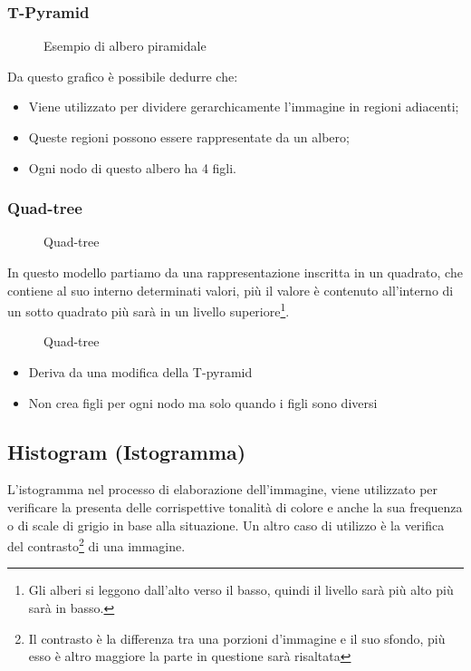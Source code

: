 \documentclass{report}
\begin{document}
\subsubsection{T-Pyramid}
\label{sec:treepy}
\begin{figure}[ht!]
  \centering
  \resizebox{15cm}{!}{
  }
  \caption{Esempio di albero piramidale}
  \label{fig:alberopir}
\end{figure}
Da questo grafico è possibile dedurre che:
\begin{itemize}
\item Viene utilizzato per dividere gerarchicamente l'immagine in regioni
  adiacenti;
\item Queste regioni possono essere rappresentate da un albero;
\item Ogni nodo di questo albero ha 4 figli.
\end{itemize}
\clearpage
\subsubsection{Quad-tree}
\label{sec:quad-tree}
\begin{figure}[ht!]
  \centering
  
  \caption{Quad-tree}
  \label{fig:qtree1}
\end{figure}
In questo modello partiamo da una rappresentazione inscritta in un
quadrato, che contiene al suo interno determinati valori, più il valore
è contenuto all'interno di un sotto quadrato più sarà in un livello
superiore\footnote{Gli alberi si leggono dall'alto verso il basso, quindi
  il livello sarà più alto più sarà in basso.}.
\begin{figure}[ht!]
  \centering
  
  \caption{Quad-tree}
  \label{fig:qtree2}
\end{figure}
\begin{itemize}
\item Deriva da una modiﬁca della T-pyramid
\item Non crea figli per ogni nodo ma solo quando i figli sono diversi
\end{itemize}

\subsection{Histogram (Istogramma)}
\label{sec:histogram}
L'istogramma nel processo di elaborazione dell'immagine, viene utilizzato
per verificare la presenta delle corrispettive tonalità di colore e
anche la sua frequenza o di scale di grigio in base alla situazione.
Un altro caso di utilizzo è la verifica del contrasto\footnote{Il
  contrasto è la differenza tra una porzioni d'immagine e il suo
sfondo, più esso è altro maggiore la parte in questione sarà risaltata}
di una immagine.
\end{document}

